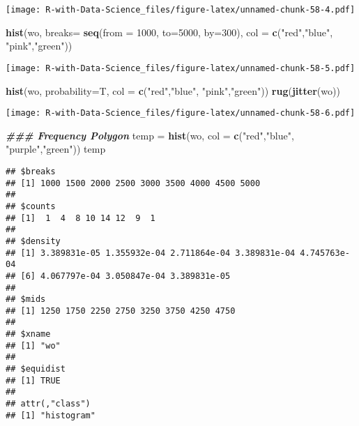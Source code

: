 \documentclass[
]{article}
\newenvironment{Shaded}{\begin{snugshade}}{\end{snugshade}}
\newcommand{\AttributeTok}[1]{\textcolor[rgb]{0.13,0.29,0.53}{#1}}
\newcommand{\DecValTok}[1]{\textcolor[rgb]{0.00,0.00,0.81}{#1}}
\newcommand{\DocumentationTok}[1]{\textcolor[rgb]{0.56,0.35,0.01}{\textbf{\textit{#1}}}}
\newcommand{\FunctionTok}[1]{\textcolor[rgb]{0.13,0.29,0.53}{\textbf{#1}}}
\newcommand{\NormalTok}[1]{#1}
\newcommand{\OtherTok}[1]{\textcolor[rgb]{0.56,0.35,0.01}{#1}}
\newcommand{\StringTok}[1]{\textcolor[rgb]{0.31,0.60,0.02}{#1}}
\begin{document}
\texttt{[image: R-with-Data-Science\_files/figure-latex/unnamed-chunk-58-4.pdf]}

\begin{Shaded}
\begin{Highlighting}[]
\FunctionTok{hist}\NormalTok{(wo, }\AttributeTok{breaks=} \FunctionTok{seq}\NormalTok{(}\AttributeTok{from =} \DecValTok{1000}\NormalTok{, }\AttributeTok{to=}\DecValTok{5000}\NormalTok{, }\AttributeTok{by=}\DecValTok{300}\NormalTok{), }\AttributeTok{col =} \FunctionTok{c}\NormalTok{(}\StringTok{"red"}\NormalTok{,}\StringTok{"blue"}\NormalTok{, }\StringTok{"pink"}\NormalTok{,}\StringTok{"green"}\NormalTok{))}
\end{Highlighting}
\end{Shaded}

\texttt{[image: R-with-Data-Science\_files/figure-latex/unnamed-chunk-58-5.pdf]}

\begin{Shaded}
\begin{Highlighting}[]
\FunctionTok{hist}\NormalTok{(wo, }\AttributeTok{probability=}\NormalTok{T, }\AttributeTok{col =} \FunctionTok{c}\NormalTok{(}\StringTok{"red"}\NormalTok{,}\StringTok{"blue"}\NormalTok{, }\StringTok{"pink"}\NormalTok{,}\StringTok{"green"}\NormalTok{))}
\FunctionTok{rug}\NormalTok{(}\FunctionTok{jitter}\NormalTok{(wo))}
\end{Highlighting}
\end{Shaded}

\texttt{[image: R-with-Data-Science\_files/figure-latex/unnamed-chunk-58-6.pdf]}

\begin{Shaded}
\begin{Highlighting}[]
\DocumentationTok{\#\#\# Frequency Polygon}
\NormalTok{temp }\OtherTok{=} \FunctionTok{hist}\NormalTok{(wo, }\AttributeTok{col =} \FunctionTok{c}\NormalTok{(}\StringTok{"red"}\NormalTok{,}\StringTok{"blue"}\NormalTok{, }\StringTok{"purple"}\NormalTok{,}\StringTok{"green"}\NormalTok{))}
\NormalTok{temp}
\end{Highlighting}
\end{Shaded}

\begin{verbatim}
## $breaks
## [1] 1000 1500 2000 2500 3000 3500 4000 4500 5000
## 
## $counts
## [1]  1  4  8 10 14 12  9  1
## 
## $density
## [1] 3.389831e-05 1.355932e-04 2.711864e-04 3.389831e-04 4.745763e-04
## [6] 4.067797e-04 3.050847e-04 3.389831e-05
## 
## $mids
## [1] 1250 1750 2250 2750 3250 3750 4250 4750
## 
## $xname
## [1] "wo"
## 
## $equidist
## [1] TRUE
## 
## attr(,"class")
## [1] "histogram"
\end{verbatim}
\end{document}
